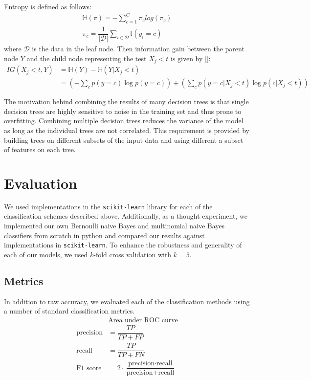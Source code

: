 \documentclass{article} %
\begin{document}
Entropy is defined as follows:
\begin{align*}
\mathbb{H}(\pi) = -\sum_{c=1}^{C}{\pi_c log(\pi_c)}\\
\pi_c = \dfrac{1}{|\mathcal{D}|}\sum_{i \in \mathcal{D}}{\mathbb{I}(y_i = c)}
\end{align*}
where $\mathcal{D}$ is the data in the leaf node. Then information gain between the parent node $Y$ and the child node representing the test $X_j < t$ is given by []:
\begin{align*}
IG(X_j < t, Y) &= \mathbb{H}(Y) - \mathbb{H}(Y | X_j < t)\\
&=\left(-\sum_c{p(y=c) \log p(y=c)}\right) + \left(\sum_c{p(y=c|X_j < t)\log p(c|X_j < t)}\right)
\end{align*}

The motivation behind combining the results of many decision trees is that single decision trees are highly sensitive to noise in the training set and thus prone to overfitting. Combining multiple decision trees reduces the variance of the model as long as the individual trees are not correlated. This requirement is provided by building trees on different subsets of the input data and using different a subset of features on each tree.

\section{Evaluation}

We used implementations in the \texttt{scikit-learn} library for each of the classification schemes described above. Additionally, as a thought experiment, we implemented our own Bernoulli naive Bayes and multinomial naive Bayes classifiers from scratch in python and compared our results against implementations in \texttt{scikit-learn}. To enhance the robustness and generality of each of our models, we used $k$-fold cross validation with $k=5$.

\subsection{Metrics}

In addition to raw accuracy, we evaluated each of the classification methods using a number of standard classification metrics.
\begin{align*}
&\text{Area under ROC curve}\\
\text{precision} &= \dfrac{TP}{TP + FP}\\
\text{recall} &= \dfrac{TP}{TP + FN}\\
\text{F1 score} &= 2 \cdot \dfrac{\text{precision} \cdot \text{recall}}{\text{precision} + \text{recall}}
\end{align*}
\end{document}
